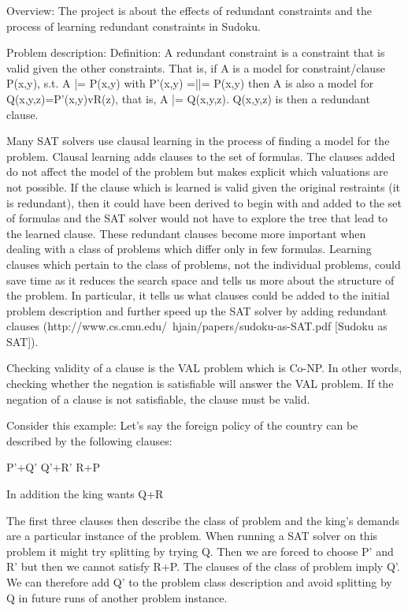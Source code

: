 \documentclass{article}
\begin{document}
Overview:
The project is about the effects of redundant constraints and the process of learning redundant constraints in Sudoku.

Problem description:
Definition: A redundant constraint is a constraint that is valid given the other constraints. That is, if A is a model for constraint/clause P(x,y), s.t. A |= P(x,y) with P'(x,y) =||= P(x,y) then A is also a model for Q(x,y,z)=P'(x,y)vR(z), that is, A |= Q(x,y,z). Q(x,y,z) is then a redundant clause.

Many SAT solvers use clausal learning in the process of finding a model for the problem. Clausal learning adds clauses to the set of formulas. The clauses added do not affect the model of the problem but makes explicit which valuations are not possible. If the clause which is learned is valid given the original restraints (it is redundant), then it could have been derived to begin with and added to the set of formulas and the SAT solver would not have to explore the tree that lead to the learned clause. These redundant clauses become more important when dealing with a class of problems which differ only in few formulas. Learning clauses which pertain to the class of problems, not the individual problems, could save time as it reduces the search space and tells us more about the structure of the problem. In particular, it tells us what clauses could be added to the initial problem description and further speed up the SAT solver by adding redundant clauses (http://www.cs.cmu.edu/~hjain/papers/sudoku-as-SAT.pdf [Sudoku as SAT]).

Checking validity of a clause is the VAL problem which is Co-NP. In other words, checking whether the negation is satisfiable will answer the VAL problem. If the negation of a clause is not satisfiable, the clause must be valid.

Consider this example:
Let's say the foreign policy of the country can be described by the following clauses:

P'+Q'
Q'+R'
R+P

In addition the king wants
Q+R

The first three clauses then describe the class of problem and the king's demands are a particular instance of the problem. When running a SAT solver on this problem it might try splitting by trying Q. Then we are forced to choose P' and R' but then we cannot satisfy R+P. The clauses of the class of problem imply Q'. We can therefore add Q' to the problem class description and avoid splitting by Q in future runs of another problem instance.
\end{document}
